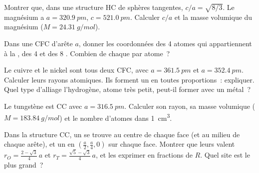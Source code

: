 \begin{exercise}[$\star\star$]\label{exo:b1:crystals-metals:6}
Montrer que, dans une structure HC de sphères tangentes,
$c/a = \sqrt{8/3}$. Le magnésium a $a = \qty{320.9}{pm}$,
$c = \qty{521.0}{pm}$. Calculer $c/a$ et la masse volumique du
magnésium ($M = \qty{24.31}{g/mol}$).
\end{exercise}

\begin{exercise}[$\star\star$]\label{exo:b1:crystals-metals:7}
Dans une  CFC d'arête $a$, donner les coordonnées des 4 atomes qui
appartiennent à la , des 4  et des 8 . Combien de chaque par atome~?
\end{exercise}

\begin{exercise}[$\star\star$]\label{exo:b1:crystals-metals:8}
Le cuivre et le nickel sont tous deux CFC, avec $a = \qty{361.5}{pm}$ et
$a = \qty{352.4}{pm}$. Calculer leurs rayons atomiques. Ils forment un
 en toutes proportions~: expliquer. Quel type
d'alliage l'hydrogène, atome très petit, peut-il former avec un métal~?
\end{exercise}

\begin{exercise}[$\star\star$]\label{exo:b1:crystals-metals:9}
Le tungstène est CC avec $a = \qty{316.5}{pm}$. Calculer son rayon, sa
masse volumique ($M = \qty{183.84}{g/mol}$) et le nombre d'atomes dans
\qty{1}{cm^3}.
\end{exercise}

\begin{exercise}[$\star\star\star$]\label{exo:b1:crystals-metals:10}
Dans la structure CC, un  se trouve au centre de chaque
face (et au milieu de chaque arête), et un  en
$(\frac{a}{2}, \frac{a}{4}, 0)$ sur chaque face. Montrer que leurs
 valent $r_O = \frac{2 - \sqrt3}{4}\,a$ et
$r_T = \frac{\sqrt5 - \sqrt3}{4}\,a$, et les exprimer en fractions de
$R$. Quel site est le plus grand~?
\end{exercise}

